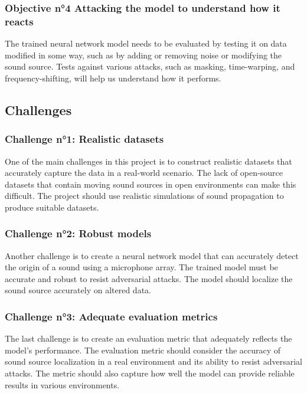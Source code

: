 \subsubsection{Objective n°4 Attacking the model to understand how it reacts}

The trained neural network model needs to be evaluated by testing it on data modified in some way, such as by adding or removing noise or modifying the sound source. Tests against various attacks, such as masking, time-warping, and frequency-shifting, will help us understand how it performs.

\subsection{Challenges}
\label{intro:challenges}

\subsubsection{Challenge n°1: Realistic datasets}

One of the main challenges in this project is to construct realistic datasets that accurately capture the data in a real-world scenario. The lack of open-source datasets that contain moving sound sources in open environments can make this difficult. The project should use realistic simulations of sound propagation to produce suitable datasets.

\subsubsection{Challenge n°2: Robust models}

Another challenge is to create a neural network model that can accurately detect the origin of a sound using a microphone array. The trained model must be accurate and robust to resist adversarial attacks. The model should localize the sound source accurately on altered data.

\subsubsection{Challenge n°3: Adequate evaluation metrics}

The last challenge is to create an evaluation metric that adequately reflects the model's performance. The evaluation metric should consider the accuracy of sound source localization in a real environment and its ability to resist adversarial attacks. The metric should also capture how well the model can provide reliable results in various environments.
